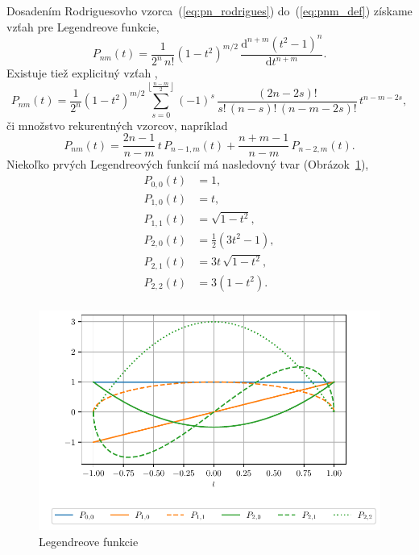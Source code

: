 \documentclass[a4paper,12pt]{book}
\newcommand{\diff}{\mathrm d}
\begin{document}
Dosadením Rodriguesovho vzorca~(\ref{eq:pn_rodrigues}) do~(\ref{eq:pnm_def})
získame vzťah pre Legendreove funkcie,
%
\begin{equation}
\label{eq:pnm_ferrer}
P_{nm}(t) = \frac{1}{2^n \, n!} (1 - t^2)^{ m \slash 2} \, \frac{\diff^{n + m}
(t^2 - 1)^n}{\diff t^{n + m}}{.}
\end{equation}
%
Existuje tiež explicitný vzťah \parencite{Freeden2009},
%
\begin{equation}
P_{nm}(t) = \frac{1}{2^n}(1 - t^2)^{m \slash 2} \sum_{s = 0}^{\left\lfloor
\frac{n - m}{2} \right\rfloor} (-1)^s \, \frac{(2n - 2s)!}{s! \, (n - s)! \, (n
- m - 2s)!} \, t^{n - m - 2s}{,}
\end{equation}
%
či
%
množstvo rekurentných vzorcov, napríklad \parencite{Freeden2009}
%
\begin{equation}
\label{eq:pnm_recurrence}
P_{nm}(t) = \frac{2n - 1}{n - m} \, t \, P_{n - 1, m}(t) + \frac{n + m - 1}{n
- m} \, P_{n - 2, m}(t){.}
\end{equation}
%
Niekoľko prvých Legendreových funkcií má nasledovný tvar
(Obrázok~\ref{fig:lf}),
%
\begin{equation}
\label{eq:lf00_to_lf22}
\begin{split}
P_{0,0}(t) & = 1{,}\\
P_{1,0}(t) & = t{,}\\
P_{1,1}(t) & = \sqrt{1 - t^2}{,}\\
P_{2,0}(t) & = \frac{1}{2}(3t^2 - 1){,}\\
P_{2,1}(t) & = 3t \, \sqrt{1 - t^2}{,}\\
P_{2,2}(t) & = 3(1 - t^2){.}\\
\end{split}
\end{equation}

\begin{figure}[bt]
\centering
\includegraphics{./fig-legendre-functions.pdf}
\caption{Legendreove funkcie}
\label{fig:lf}
\end{figure}
\end{document}
